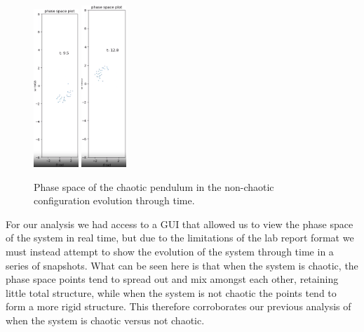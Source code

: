 \documentclass[11pt]{article} %
\begin{document}
\begin{figure}[H]
        \includegraphics[width=0.15\textwidth]{phase_4A.png}
        \includegraphics[width=0.15\textwidth]{phase_5A.png}
        \caption{Phase space of the chaotic pendulum in the non-chaotic configuration evolution through time.}
    \end{figure}
    For our analysis we had access to a GUI that allowed us to view the phase space of the system in real time, but due to the limitations of the lab report
    format we must instead attempt to show the evolution of the system through time in a series of snapshots. What can be seen here is that when the system is
    chaotic, the phase space points tend to spread out and mix amongst each other, retaining little total structure, while when the system is not chaotic the
    points tend to form a more rigid structure. This therefore corroborates our previous analysis of when the system is chaotic versus not chaotic.
\end{document}
